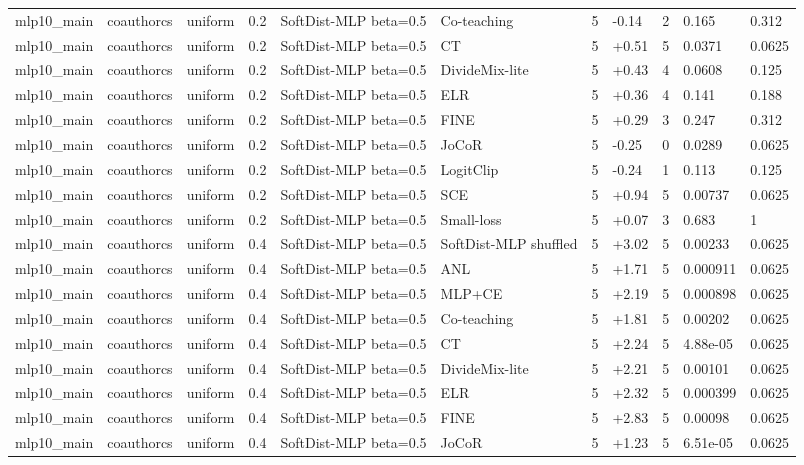 \begin{table}[t]
\begin{tabular}{llllllrlrll}
mlp10_main & coauthorcs & uniform & 0.2 & SoftDist-MLP beta=0.5 & Co-teaching & 5 & -0.14 & 2 & 0.165 & 0.312 \\
mlp10_main & coauthorcs & uniform & 0.2 & SoftDist-MLP beta=0.5 & CT & 5 & +0.51 & 5 & 0.0371 & 0.0625 \\
mlp10_main & coauthorcs & uniform & 0.2 & SoftDist-MLP beta=0.5 & DivideMix-lite & 5 & +0.43 & 4 & 0.0608 & 0.125 \\
mlp10_main & coauthorcs & uniform & 0.2 & SoftDist-MLP beta=0.5 & ELR & 5 & +0.36 & 4 & 0.141 & 0.188 \\
mlp10_main & coauthorcs & uniform & 0.2 & SoftDist-MLP beta=0.5 & FINE & 5 & +0.29 & 3 & 0.247 & 0.312 \\
mlp10_main & coauthorcs & uniform & 0.2 & SoftDist-MLP beta=0.5 & JoCoR & 5 & -0.25 & 0 & 0.0289 & 0.0625 \\
mlp10_main & coauthorcs & uniform & 0.2 & SoftDist-MLP beta=0.5 & LogitClip & 5 & -0.24 & 1 & 0.113 & 0.125 \\
mlp10_main & coauthorcs & uniform & 0.2 & SoftDist-MLP beta=0.5 & SCE & 5 & +0.94 & 5 & 0.00737 & 0.0625 \\
mlp10_main & coauthorcs & uniform & 0.2 & SoftDist-MLP beta=0.5 & Small-loss & 5 & +0.07 & 3 & 0.683 & 1 \\
mlp10_main & coauthorcs & uniform & 0.4 & SoftDist-MLP beta=0.5 & SoftDist-MLP shuffled & 5 & +3.02 & 5 & 0.00233 & 0.0625 \\
mlp10_main & coauthorcs & uniform & 0.4 & SoftDist-MLP beta=0.5 & ANL & 5 & +1.71 & 5 & 0.000911 & 0.0625 \\
mlp10_main & coauthorcs & uniform & 0.4 & SoftDist-MLP beta=0.5 & MLP+CE & 5 & +2.19 & 5 & 0.000898 & 0.0625 \\
mlp10_main & coauthorcs & uniform & 0.4 & SoftDist-MLP beta=0.5 & Co-teaching & 5 & +1.81 & 5 & 0.00202 & 0.0625 \\
mlp10_main & coauthorcs & uniform & 0.4 & SoftDist-MLP beta=0.5 & CT & 5 & +2.24 & 5 & 4.88e-05 & 0.0625 \\
mlp10_main & coauthorcs & uniform & 0.4 & SoftDist-MLP beta=0.5 & DivideMix-lite & 5 & +2.21 & 5 & 0.00101 & 0.0625 \\
mlp10_main & coauthorcs & uniform & 0.4 & SoftDist-MLP beta=0.5 & ELR & 5 & +2.32 & 5 & 0.000399 & 0.0625 \\
mlp10_main & coauthorcs & uniform & 0.4 & SoftDist-MLP beta=0.5 & FINE & 5 & +2.83 & 5 & 0.00098 & 0.0625 \\
mlp10_main & coauthorcs & uniform & 0.4 & SoftDist-MLP beta=0.5 & JoCoR & 5 & +1.23 & 5 & 6.51e-05 & 0.0625 \\

\end{tabular}
\end{table}
